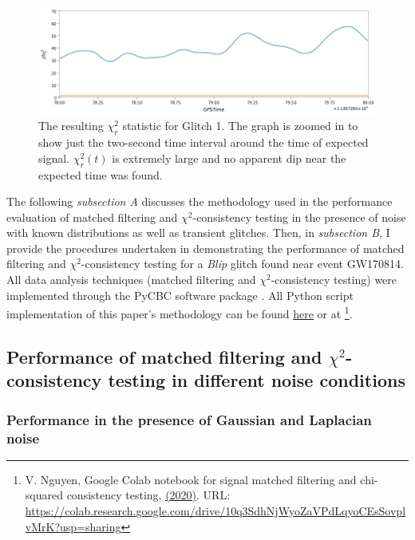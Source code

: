 \documentclass[preprint,
letterpaper,
 amsmath,amssymb,
 aps,
]{revtex4-2}
\begin{document}
\begin{figure}[t]
\includegraphics[width = .9\textwidth]{chi2 glitch 1.png}
\caption{The resulting $\chi^2_r$ statistic for Glitch 1. The graph is zoomed in to show just the two-second time interval around the time of expected signal. $\chi_r^2(t)$ is extremely large and no apparent dip near the expected time was found.}
\centering
\end{figure} 

The following \textit{subsection A} discusses the methodology used in the performance evaluation of matched filtering and $\chi^2$-consistency testing in the presence of noise with known distributions as well as transient glitches. Then, in \textit{subsection B}, I provide the procedures undertaken in demonstrating the performance of matched filtering and $\chi^2$-consistency testing for a \textit{Blip} glitch found near event GW170814. All data analysis techniques (matched filtering and $\chi^2$-consistency testing) were implemented through the PyCBC software package \cite{pycbc}. All Python script implementation of this paper's methodology can be found \href{https://colab.research.google.com/drive/10q3SdhNjWyoZaVPdLqyoCEsSovplvMrK?usp=sharing}{here} or at  \footnote{V. Nguyen, Google Colab notebook for signal matched filtering and chi-squared consistency testing, \href{https://colab.research.google.com/drive/10q3SdhNjWyoZaVPdLqyoCEsSovplvMrK?usp=sharing}{(2020)}. URL: \url{https://colab.research.google.com/drive/10q3SdhNjWyoZaVPdLqyoCEsSovplvMrK?usp=sharing}}.

\subsection{Performance of matched filtering and $\chi^2$-consistency testing in different noise conditions}

\subsubsection{Performance in the presence of Gaussian and Laplacian noise} \label{gaussian}
\end{document}
